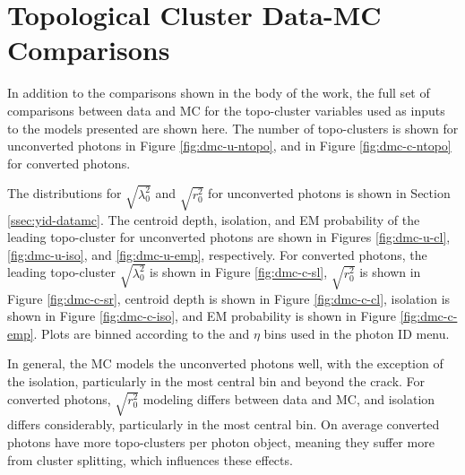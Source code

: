 \chapter{Topological Cluster Data-MC Comparisons} \label{app:datamc}

In addition to the comparisons shown in the body of the work, the full set of comparisons between data and \gls{MC} for the topo-cluster variables used as inputs to the models presented are shown here. The number of topo-clusters is shown for unconverted photons in Figure \ref{fig:dmc-u-ntopo}, and in Figure \ref{fig:dmc-c-ntopo} for converted photons.

The distributions for $\sqrt{\lambda_{0}^2}$ and $\sqrt{r_{0}^2}$ for unconverted photons is shown in Section \ref{ssec:yid-datamc}. The centroid depth, isolation, and \gls{EM} probability of the leading topo-cluster for unconverted photons are shown in Figures \ref{fig:dmc-u-cl}, \ref{fig:dmc-u-iso}, and \ref{fig:dmc-u-emp}, respectively. For converted photons, the leading topo-cluster $\sqrt{\lambda_{0}^2}$ is shown in Figure \ref{fig:dmc-c-sl}, $\sqrt{r_{0}^2}$ is shown in Figure \ref{fig:dmc-c-sr}, centroid depth is shown in Figure \ref{fig:dmc-c-cl}, isolation is shown in Figure \ref{fig:dmc-c-iso}, and \gls{EM} probability is shown in Figure \ref{fig:dmc-c-emp}. Plots are binned according to the \pt and $\eta$ bins used in the photon ID menu.

In general, the \gls{MC} models the unconverted photons well, with the exception of the isolation, particularly in the most central bin and beyond the crack. For converted photons, $\sqrt{r_{0}^2}$ modeling differs between data and \gls{MC}, and isolation differs considerably, particularly in the most central bin. On average converted photons have more topo-clusters per photon object, meaning they suffer more from cluster splitting, which influences these effects.

